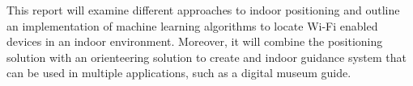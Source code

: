 This report will examine different approaches to indoor positioning and outline an implementation of machine learning algorithms to locate Wi-Fi enabled devices in an indoor environment. Moreover, it will combine the positioning solution with an orienteering solution to create and indoor guidance system that can be used in multiple applications, such as a digital museum guide.